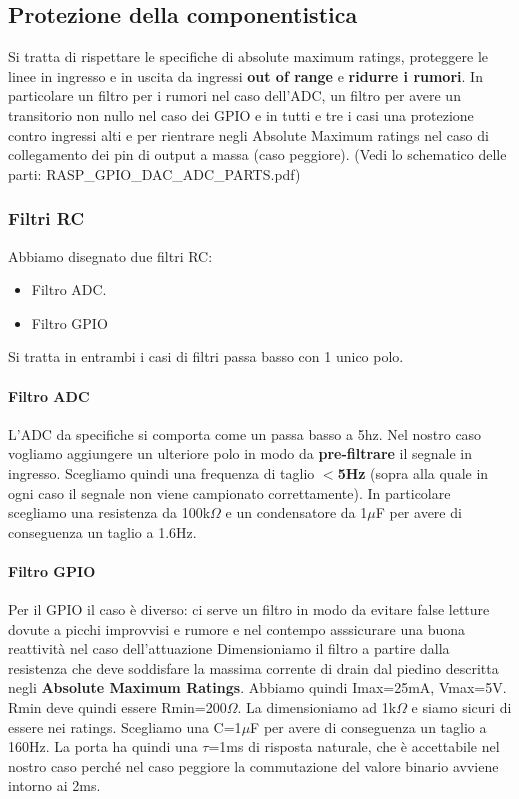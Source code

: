 \documentclass[10pt]{article}
\begin{document}
	\subsection{Protezione della componentistica}
		Si tratta di rispettare le specifiche di absolute maximum ratings, proteggere le linee in ingresso e in uscita da ingressi \textbf{out of range} e \textbf{ridurre i rumori}.
		In particolare un filtro per i rumori nel caso dell'ADC, un filtro per avere un transitorio non nullo nel caso dei GPIO e in tutti e tre i casi una protezione contro ingressi alti e per rientrare negli Absolute Maximum ratings nel caso di collegamento dei pin di output a massa (caso peggiore).
		(Vedi lo schematico delle parti: RASP\_GPIO\_DAC\_ADC\_PARTS.pdf)
		\subsubsection{Filtri RC}
		Abbiamo disegnato due filtri RC:
		\begin{itemize}
		        \item Filtro ADC.
		        \item Filtro GPIO
		\end{itemize}
		Si tratta in entrambi i casi di filtri passa basso con 1 unico polo.
			\paragraph{Filtro ADC}
				L'ADC da specifiche si comporta come un passa basso a 5hz. Nel nostro caso vogliamo aggiungere un ulteriore polo in modo da \textbf{pre-filtrare} il segnale in ingresso.
				Scegliamo quindi una frequenza di taglio \textbf{\(<\)5Hz} (sopra alla quale in ogni caso il segnale non viene campionato correttamente).
				In particolare scegliamo una resistenza da 100k\(\Omega\) e un condensatore da 1\(\mu\)F per avere di conseguenza un taglio a 1.6Hz.
			\paragraph{Filtro GPIO}
				Per il GPIO il caso è diverso: ci serve un filtro in modo da evitare false letture dovute a picchi improvvisi e rumore e nel contempo asssicurare una buona reattività nel caso dell'attuazione
				Dimensioniamo il filtro a partire dalla resistenza che deve soddisfare la massima corrente di drain dal piedino descritta negli \textbf{Absolute Maximum Ratings}.
				Abbiamo quindi Imax=25mA, Vmax=5V. Rmin deve quindi essere Rmin=200\(\Omega\). La dimensioniamo ad 1k\(\Omega\) e siamo sicuri di essere nei ratings.
				Scegliamo una C=1\(\mu\)F per avere di conseguenza un taglio a 160Hz. La porta ha quindi una \(\tau\)=1ms di risposta naturale, che è accettabile nel nostro caso perché nel caso peggiore la commutazione del valore binario avviene intorno ai 2ms.
\end{document}
